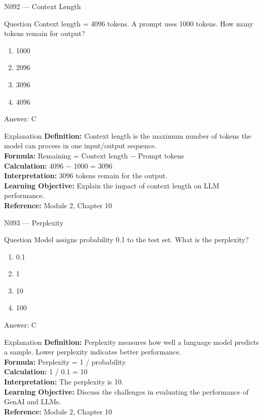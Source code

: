 \documentclass[aspectratio=169,8pt]{beamer}
\begin{document}
	\begin{frame}{N092 --- Context Length}
		\begin{block}{Question}
			Context length = 4096 tokens. A prompt uses 1000 tokens. How many tokens remain for output?
			\begin{enumerate}
				\item 1000
				\item 2096
				\item 3096
				\item 4096
			\end{enumerate}
		\end{block}
		\begin{exampleblock}{Answer: C}\end{exampleblock}
		\begin{block}{Explanation}
			\textbf{Definition:} Context length is the maximum number of tokens the model can process in one input/output sequence.\\
			\textbf{Formula:} Remaining = Context length $-$ Prompt tokens\\
			\textbf{Calculation:} 4096 $-$ 1000 = 3096\\
			\textbf{Interpretation:} 3096 tokens remain for the output.\\
			\textbf{Learning Objective:} Explain the impact of context length on LLM performance.\\
			\textbf{Reference:} Module 2, Chapter 10
		\end{block}
	\end{frame}
	
	\begin{frame}{N093 --- Perplexity}
		\begin{block}{Question}
			Model assigns probability 0.1 to the test set. What is the perplexity?
			\begin{enumerate}
				\item 0.1
				\item 1
				\item 10
				\item 100
			\end{enumerate}
		\end{block}
		\begin{exampleblock}{Answer: C}\end{exampleblock}
		\begin{block}{Explanation}
			\textbf{Definition:} Perplexity measures how well a language model predicts a sample. Lower perplexity indicates better performance.\\
			\textbf{Formula:} Perplexity = 1 / probability\\
			\textbf{Calculation:} 1 / 0.1 = 10\\
			\textbf{Interpretation:} The perplexity is 10.\\
			\textbf{Learning Objective:} Discuss the challenges in evaluating the performance of GenAI and LLMs.\\
			\textbf{Reference:} Module 2, Chapter 10
		\end{block}
	\end{frame}
	
\end{document}
